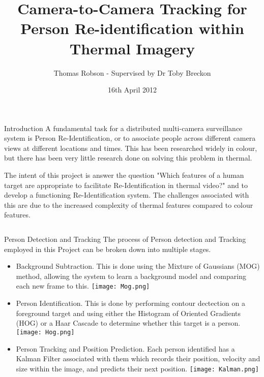 \documentclass[final]{beamer}
\title[Thermal Re-ID]{Camera-to-Camera Tracking for Person Re-identification within Thermal Imagery}
\author[G Ingram]{Thomas Robson - Supervised by Dr Toby Breckon}
\institute[Durham]{School of Engineering and Computing Sciences, Durham University}
\date{16th April 2012}
\begin{document}
  \begin{frame}{} 

  \vfill
  \begin{block}{Introduction}
          A fundamental task for a distributed multi-camera surveillance system is Person Re-Identification, or to associate people across different camera views at different locations and times. This has been researched widely in colour, but there has been very little research done on solving this problem in thermal. 

The intent of this project is answer the question "Which features of a human target are appropriate to facilitate Re-Identification in thermal video?" and to develop a functioning Re-Identification system. The challenges associated with this are due to the increased complexity of thermal features compared to colour features.
        \end{block}
    \begin{columns}[t]
      \begin{column}{.48\linewidth}
        
        \begin{block}{Person Detection and Tracking}
        	The process of Person detection and Tracking employed in this Project can be broken down into multiple stages. 
        	\begin{itemize}
        	\item Background Subtraction. This is done using the Mixture of Gaussians (MOG) method, allowing the system to learn a background model and comparing each new frame to this. 
        	\texttt{[image: Mog.png]}
        	\item Person Identification. This is done by performing contour dectection on a foreground target and using either the Histogram of Oriented Gradients (HOG) or a Haar Cascade to determine whether this target is a person.
        	\texttt{[image: Hog.png]}
        	\item Person Tracking and Position Prediction. Each person identified has a Kalman Filter associated with them which records their position, velocity and size within the image, and predicts their next position. 
          \texttt{[image: Kalman.png]}
          \end{itemize}
        \end{block}
        
        
      \end{column}



\end{columns}
\end{frame}
\end{document}
